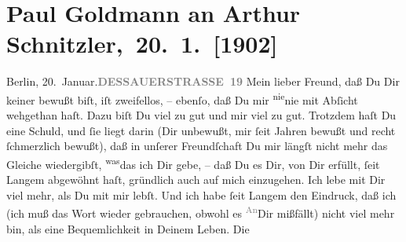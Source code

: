 

         
         \renewcommand{\erwaehntePersonen}{Personen: Gerhart Hauptmann}
         \renewcommand{\erwaehnteOrte}{Orte: Berlin, Dessauer Straße, Wien}
         \renewcommand{\erwaehnteWerke}{Werke: Berliner Theater. »Einsame Menschen« im Deutschen Theater}
               \section[ Paul Goldmann an Arthur Schnitzler, 20. 1. {[}1902{]}]{ Paul Goldmann an Arthur Schnitzler, 20. 1. {[}1902{]}}\nopagebreak{}\rehead{ }\begin{ledgroupsized}[t]{13cm}\normalsize\beginnumbering \toendnotes[C]{\smallbreak\pagebreak[2]} 
\toendnotes[C]{\smallbreak}\pstart
           \noindent{}{\pb}Berlin, 20. Januar.\hfill \textcolor{gray}{\textbf{DESSAUERSTRASSE 19}}\pend
           \pstart
           Mein lieber Freund, daß Du Dir keiner \label{K_L03194-1v}\label{K_L03194-1h} bewußt biſt, iſt zweifellos, – ebenſo, daß Du mir \substVorne{}\textsuperscript{nie}\substDazwischen{}nie\substHinten{} mit Abſicht wehgethan haſt. Dazu biſt Du viel zu gut und mir viel zu gut.
                   Trotzdem haſt Du eine Schuld, und ſie liegt darin (Dir unbewußt, mir ſeit
               Jahren bewußt und recht ſchmerzlich bewußt), daß in unſerer Freundſchaft Du mir
               längſt nicht mehr das Gleiche wiedergibſt, \substVorne{}\textsuperscript{was}\substDazwischen{}das\substHinten{} ich Dir gebe, – daß Du  es Dir, von
               Dir erfüllt, ſeit Langem abgewöhnt haſt, \strikeout{\textcolor{gray}{r}} gründlich auch auf mich einzugehen. Ich lebe mit Dir viel mehr, als Du mit mir
               lebſt. Und ich habe ſeit Langem den Eindruck, daß ich (ich muß das Wort wieder
               gebrauchen,  obwohl es \substVorne{}\textsuperscript{\textcolor{gray}{An}}\substDazwischen{}Dir\substHinten{} mißfällt) nicht viel mehr bin, als eine Bequemlichkeit in Deinem Leben. Die

\end{ledgroupsized}
